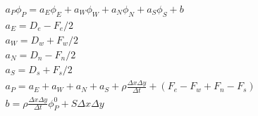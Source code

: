 \begin{equation}
\begin{array}{c}
	a_P \phi _P = a_E \phi _E  + a_W \phi _W + a_N \phi _N + a_S \phi _S + b \\
	a_E = D_e - F_e/2 \\
	a_W = D_w + F_w/2 \\
	a_N = D_n - F_n/2 \\
	a_S = D_s + F_s/2 \\
	a_P = a_E + a_W + a_N + a_S + \rho \frac{\Delta x \Delta y}{\Delta t} + \left(F_e - F_w + F_n - F_s \right) \\
	b = \rho \frac{\Delta x \Delta y}{\Delta t} \phi _P ^0 + S \Delta x \Delta y
\end{array}
\end{equation}